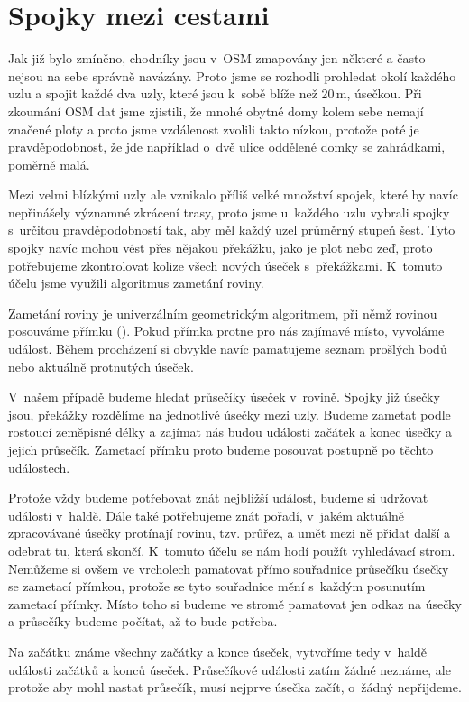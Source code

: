 \section{Spojky mezi cestami}
Jak již bylo zmíněno, chodníky jsou v~OSM zmapovány jen některé a často nejsou
na sebe správně navázány. Proto jsme se rozhodli prohledat okolí každého uzlu a
spojit každé dva uzly, které jsou k~sobě blíže než 20\,m, úsečkou. Při zkoumání
OSM dat jsme zjistili, že mnohé obytné domy kolem sebe nemají značené ploty a
proto jsme vzdálenost zvolili takto nízkou, protože poté je pravděpodobnost, že
jde například o~dvě ulice oddělené domky se zahrádkami, poměrně malá.  

Mezi velmi blízkými uzly ale vznikalo příliš velké množství spojek, které by
navíc nepřinášely významné zkrácení trasy, proto jsme u~každého uzlu vybrali
spojky s~určitou pravděpodobností tak, aby měl každý uzel průměrný stupeň šest.
Tyto spojky navíc mohou vést přes nějakou překážku, jako je plot nebo zeď, proto
potřebujeme zkontrolovat kolize všech nových úseček s~překážkami. K~tomuto účelu
jsme využili algoritmus zametání roviny.

Zametání roviny\cite{zametani} je univerzálním geometrickým algoritmem, při němž
rovinou posouváme přímku (). Pokud přímka protne pro nás zajímavé
místo, vyvoláme událost. Během procházení si obvykle navíc pamatujeme seznam
prošlých bodů nebo aktuálně protnutých úseček.

V~našem případě budeme hledat průsečíky úseček v~rovině. Spojky již úsečky jsou,
překážky rozdělíme na jednotlivé úsečky mezi uzly. Budeme zametat podle rostoucí
zeměpisné délky a zajímat nás budou události začátek a konec úsečky a jejich
průsečík. Zametací přímku proto budeme posouvat postupně po těchto událostech.

Protože vždy budeme potřebovat znát nejbližší událost, budeme si udržovat
události v~haldě. Dále také potřebujeme znát pořadí, v~jakém aktuálně
zpracovávané úsečky protínají rovinu, tzv. průřez, a umět mezi ně přidat další a
odebrat tu, která skončí. K~tomuto účelu se nám hodí použít vyhledávací strom.
Nemůžeme si ovšem ve vrcholech pamatovat přímo souřadnice průsečíku úsečky se
zametací přímkou, protože se tyto souřadnice mění s~každým posunutím zametací
přímky. Místo toho si budeme ve stromě pamatovat jen odkaz na úsečky a průsečíky
budeme počítat, až to bude potřeba.

Na začátku známe všechny začátky a konce úseček, vytvoříme tedy v~haldě události
začátků a konců úseček. Průsečíkové události zatím žádné neznáme, ale protože
aby mohl nastat průsečík, musí nejprve úsečka začít, o~žádný nepřijdeme. 

